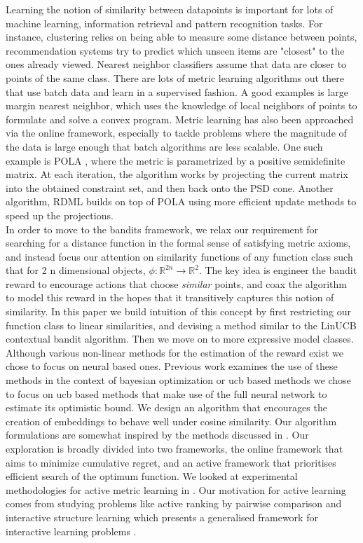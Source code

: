 \documentclass{article}
\begin{document}
Learning the notion of similarity between datapoints is important for lots of machine learning, information retrieval and pattern recognition tasks. For instance, clustering relies on being able to measure some distance between points, recommendation systems try to predict which unseen items are "closest" to the ones already viewed. Nearest neighbor classifiers assume that data are closer to points of the same class. There are lots of metric learning algorithms out there that use batch data and learn in a supervised fashion. A good examples is large margin nearest neighbor, which uses the knowledge of local neighbors of points to formulate and solve a convex program. Metric learning has also been approached via the online framework, especially to tackle problems where the magnitude of the data is large enough that batch algorithms are less scalable. One such example is POLA \cite{pola}, where the metric is parametrized by a positive semidefinite matrix. At each iteration, the algorithm works by projecting the current matrix into the obtained constraint set, and then back onto the PSD cone. Another algorithm, RDML \cite{rdml} builds on top of POLA using more efficient update methods to speed up the projections. \\


In order to move to the bandits framework, we relax our requirement for searching for a distance function in the formal sense of satisfying metric axioms, and instead focus our attention on similarity functions of any function class such that  for 2 n dimensional objects, $\phi: \mathbb{R}^{2n} \to \mathbb{R}^2$. The key idea is engineer the bandit reward to encourage actions that choose \textit{similar} points, and coax the algorithm to model this reward in the hopes that it transitively captures this notion of similarity. In this paper we build intuition of this concept by first restricting our function class to linear similarities, and devising a method similar to the LinUCB contextual bandit algorithm. Then we move on to more expressive model classes. Although various non-linear methods for the estimation of the reward exist we chose to focus on neural based ones. Previous work examines the use of these methods in the context of bayesian optimization \cite{deep-bayesian-bandits-show-down} or ucb based methods \cite{neuralucb}\cite{shallow} we chose to focus on ucb based methods that make use of the full neural network to estimate its optimistic bound.  We design an algorithm that encourages the creation of embeddings to behave well under cosine similarity. Our algorithm formulations are somewhat inspired by the methods discussed in \cite{deep-bayesian-bandits-show-down}. Our exploration is broadly divided into two frameworks, the online framework that aims to minimize cumulative regret, and an active framework that prioritises efficient search of the optimum function. We looked at experimental methodologies for active metric learning in \cite{active-learning}. Our motivation for active learning comes from studying problems like active ranking by pairwise comparison \cite{ranking} and interactive structure learning which presents a generalised framework for interactive learning problems \cite{SQBC}.  
\end{document}
